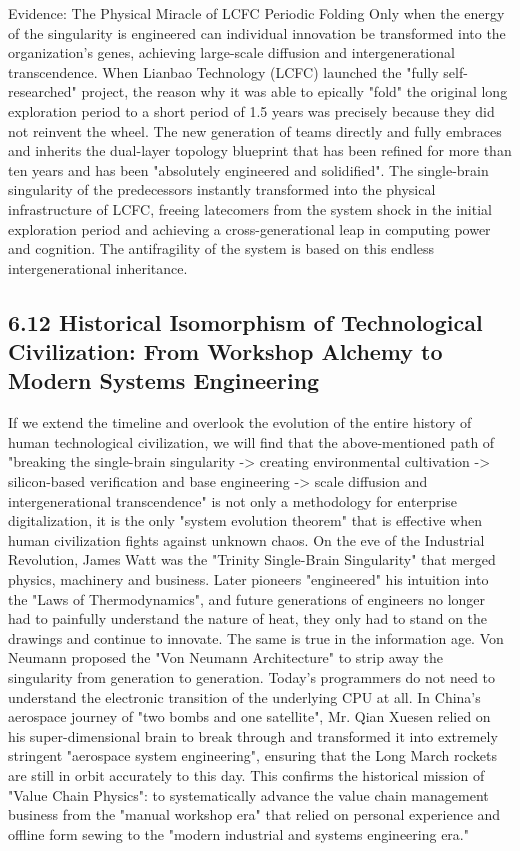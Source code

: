 \documentclass[11pt,a4paper]{article}
\begin{document}
Evidence: The Physical Miracle of LCFC Periodic Folding Only when the energy of the singularity is engineered can individual innovation be transformed into the organization’s genes, achieving large-scale diffusion and intergenerational transcendence. When Lianbao Technology (LCFC) launched the "fully self-researched" project, the reason why it was able to epically "fold" the original long exploration period to a short period of 1.5 years was precisely because they did not reinvent the wheel. The new generation of teams directly and fully embraces and inherits the dual-layer topology blueprint that has been refined for more than ten years and has been "absolutely engineered and solidified". The single-brain singularity of the predecessors instantly transformed into the physical infrastructure of LCFC, freeing latecomers from the system shock in the initial exploration period and achieving a cross-generational leap in computing power and cognition. The antifragility of the system is based on this endless intergenerational inheritance.


\subsection*{6.12 Historical Isomorphism of Technological Civilization: From Workshop Alchemy to Modern Systems Engineering}


If we extend the timeline and overlook the evolution of the entire history of human technological civilization, we will find that the above-mentioned path of "breaking the single-brain singularity -> creating environmental cultivation -> silicon-based verification and base engineering -> scale diffusion and intergenerational transcendence" is not only a methodology for enterprise digitalization, it is the only "system evolution theorem" that is effective when human civilization fights against unknown chaos. On the eve of the Industrial Revolution, James Watt was the "Trinity Single-Brain Singularity" that merged physics, machinery and business. Later pioneers "engineered" his intuition into the "Laws of Thermodynamics", and future generations of engineers no longer had to painfully understand the nature of heat, they only had to stand on the drawings and continue to innovate. The same is true in the information age. Von Neumann proposed the "Von Neumann Architecture" to strip away the singularity from generation to generation. Today's programmers do not need to understand the electronic transition of the underlying CPU at all. In China's aerospace journey of "two bombs and one satellite", Mr. Qian Xuesen relied on his super-dimensional brain to break through and transformed it into extremely stringent "aerospace system engineering", ensuring that the Long March rockets are still in orbit accurately to this day. This confirms the historical mission of "Value Chain Physics": to systematically advance the value chain management business from the "manual workshop era" that relied on personal experience and offline form sewing to the "modern industrial and systems engineering era."
\end{document}
